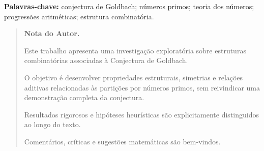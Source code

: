 \documentclass[a4paper,11pt]{article}
\theoremstyle{definition}
\theoremstyle{remark}
\begin{document}
	\textbf{Palavras-chave:} conjectura de Goldbach; números primos; teoria dos
	números; progressões aritméticas; estrutura combinatória.
	
	\begin{quote}
		\textbf{Nota do Autor.}
		
		Este trabalho apresenta uma investigação exploratória sobre estruturas combinatórias associadas à Conjectura de Goldbach.
		
		O objetivo é desenvolver propriedades estruturais, simetrias e relações aditivas relacionadas às partições por números primos, sem reivindicar uma demonstração completa da conjectura.
		
		Resultados rigorosos e hipóteses heurísticas são explicitamente distinguidos ao longo do texto.
		
		Comentários, críticas e sugestões matemáticas são bem-vindos.
	\end{quote}
	
\end{document}
